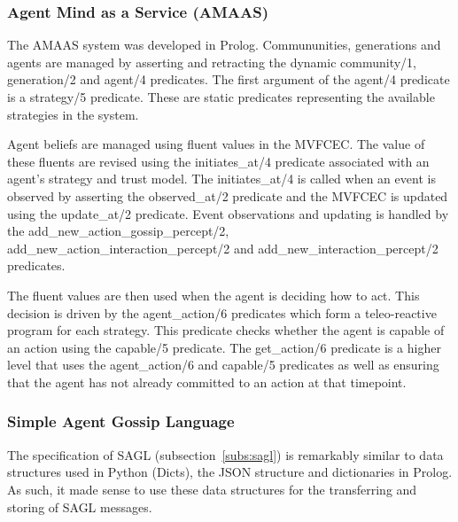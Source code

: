 \documentclass[]{final_report}
\begin{document}
\subsubsection{Agent Mind as a Service (AMAAS)}
The AMAAS system was developed in Prolog. Commununities, generations and agents are managed by asserting and retracting the dynamic community/1, generation/2 and agent/4 predicates. The first argument of the agent/4 predicate is a strategy/5 predicate. These are static predicates representing the available strategies in the system.\par 
Agent beliefs are managed using fluent values in the MVFCEC. The value of these fluents are revised using the initiates\_at/4 predicate associated with an agent's strategy and trust model. The initiates\_at/4 is called when an event is observed by asserting the observed\_at/2 predicate and the MVFCEC is updated using the update\_at/2 predicate. Event observations and updating is handled by the add\_new\_action\_gossip\_percept/2, add\_new\_action\_interaction\_percept/2 and add\_new\_interaction\_percept/2 predicates.\par 
The fluent values are then used when the agent is deciding how to act. This decision is driven by the agent\_action/6 predicates which form a teleo-reactive program for each strategy. This predicate checks whether the agent is capable of an action using the capable/5 predicate. The get\_action/6 predicate is a higher level that uses the agent\_action/6 and capable/5 predicates as well as ensuring that the agent has not already committed to an action at that timepoint.

\subsubsection{Simple Agent Gossip Language}
The specification of SAGL (subsection~\ref{subs:sagl}) is remarkably similar to data structures used in Python (Dicts), the JSON structure and dictionaries in Prolog. As such, it made sense to use these data structures for the transferring and storing of SAGL messages.
\end{document}
